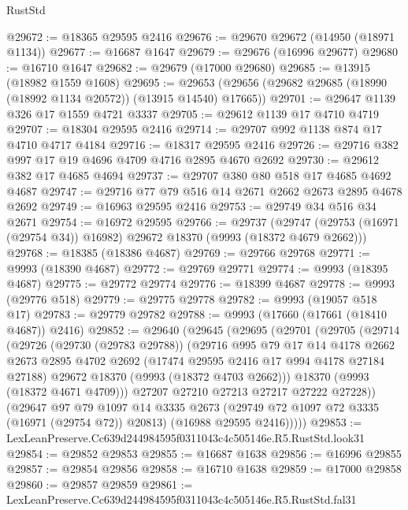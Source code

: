 \begin{lexlean}{RustStd}
\begin{coremodule}
@29672 := @18365 @29595 @2416
@29676 := @29670 @29672 (@14950 (@18971 @1134))
@29677 := @16687 @1647
@29679 := @29676 (@16996 @29677)
@29680 := @16710 @1647
@29682 := @29679 (@17000 @29680)
@29685 := @13915 (@18982 @1559 @1608)
@29695 := @29653 (@29656 (@29682 @29685 (@18990 (@18992 @1134 @20572)) (@13915 @14540) @17665))
@29701 := @29647 @1139 @326 @17 @1559 @4721 @3337
@29705 := @29612 @1139 @17 @4710 @4719
@29707 := @18304 @29595 @2416
@29714 := @29707 @992 @1138 @874 @17 @4710 @4717 @4184
@29716 := @18317 @29595 @2416
@29726 := @29716 @382 @997 @17 @19 @4696 @4709 @4716 @2895 @4670 @2692
@29730 := @29612 @382 @17 @4685 @4694
@29737 := @29707 @380 @80 @518 @17 @4685 @4692 @4687
@29747 := @29716 @77 @79 @516 @14 @2671 @2662 @2673 @2895 @4678 @2692
@29749 := @16963 @29595 @2416
@29753 := @29749 @34 @516 @34 @2671
@29754 := @16972 @29595
@29766 := @29737
    (@29747 (@29753 (@16971 (@29754 @34)) @16982) @29672 @18370 (@9993 (@18372 @4679 @2662)))
@29768 := @18385 (@18386 @4687)
@29769 := @29766 @29768
@29771 := @9993 (@18390 @4687)
@29772 := @29769 @29771
@29774 := @9993 (@18395 @4687)
@29775 := @29772 @29774
@29776 := @18399 @4687
@29778 := @9993 (@29776 @518)
@29779 := @29775 @29778
@29782 := @9993 (@19057 @518 @17)
@29783 := @29779 @29782
@29788 := @9993 (@17660 (@17661 (@18410 @4687)) @2416)
@29852 := @29640
    (@29645
      (@29695
        (@29701
          (@29705
            (@29714
              (@29726
                (@29730 (@29783 @29788))
                (@29716
                  @995
                  @79
                  @17
                  @14
                  @4178
                  @2662
                  @2673
                  @2895
                  @4702
                  @2692
                  (@17474 @29595 @2416 @17 @994 @4178 @27184 @27188)
                  @29672
                  @18370
                  (@9993 (@18372 @4703 @2662)))
                @18370
                (@9993 (@18372 @4671 @4709)))
              @27207
              @27210
              @27213
              @27217
              @27222
              @27228))
          (@29647
            @97
            @79
            @1097
            @14
            @3335
            @2673
            (@29749 @72 @1097 @72 @3335 (@16971 (@29754 @72)) @20813)
            (@16988 @29595 @2416)))))
@29853 := LexLeanPreserve.Cc639d244984595f0311043c4c505146e.R5.RustStd.look31
@29854 := @29852 @29853
@29855 := @16687 @1638
@29856 := @16996 @29855
@29857 := @29854 @29856
@29858 := @16710 @1638
@29859 := @17000 @29858
@29860 := @29857 @29859
@29861 := LexLeanPreserve.Cc639d244984595f0311043c4c505146e.R5.RustStd.fal31

\end{coremodule}
\end{lexlean}
